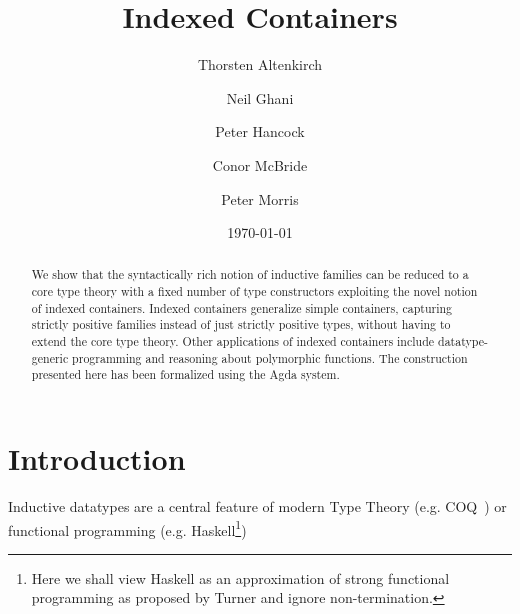 \documentclass[a4paper]{article}
\begin{document}

\newtheorem{proposition}[theorem]{Proposition}
\newenvironment{proof}[1][Proof]{\begin{trivlist}
\item[\hskip \labelsep {\bfseries #1}]}{\end{trivlist}}

\title{Indexed Containers}
\author{Thorsten Altenkirch 
   \and Neil Ghani 
   \and Peter Hancock 
   \and Conor McBride 
   \and Peter Morris}
\date{\today}

\maketitle

\begin{abstract}

  We show that the syntactically rich notion of inductive families can
  be reduced to a core type theory with a fixed number of type
  constructors exploiting the novel notion of indexed containers.
  Indexed containers generalize simple containers, capturing strictly
  positive families instead of just strictly positive types, without
  having to extend the core type theory. Other applications of indexed
  containers include datatype-generic programming and reasoning about
  polymorphic functions. The construction presented here has been
  formalized using the Agda system.

\end{abstract}



\section{Introduction}




\noindent Inductive datatypes are a central feature of modern Type Theory
(e.g. COQ~\cite{CIC}) or functional programming (e.g. 
Haskell\footnote{Here we shall view Haskell as an approximation of strong
  functional programming as proposed by Turner \cite{sfp} and ignore
non-termination.})
\end{document}

